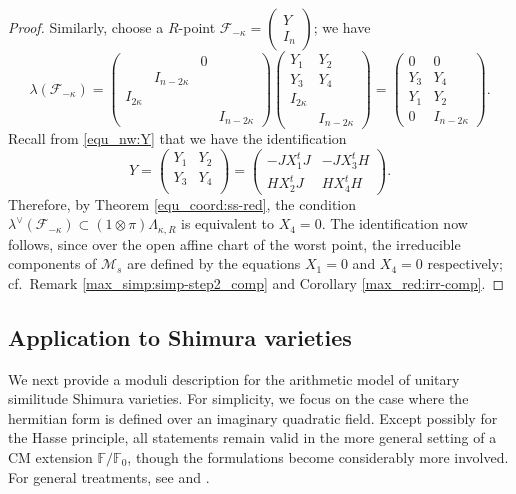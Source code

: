 \documentclass[pdflatex,sn-mathphys-num]{sn-jnl}%
\theoremstyle{thmstyleone}%
\theoremstyle{thmstyletwo}%
\numberwithin{equation}{subsection}
\theoremstyle{thmstylethree}%
\newcommand{\BF}{\ensuremath{\mathbb{F}}\xspace}
\newcommand{\CF}{\ensuremath{\mathcal{F}}\xspace}
\newcommand{\CM}{\ensuremath{\mathcal{M}}\xspace}
\begin{document}
\begin{proof}
Similarly, choose a $R$-point $\CF_{-\kappa}=\left(\begin{matrix}
	Y\\I_n
\end{matrix}\right)$; we have
\begin{equation*}
    \lambda(\CF_{-\kappa})=
    \left(
\begin{matrix}
	&          &   0      &   \\
	&   I_{n-2\kappa}  &          &   \\
	I_{2\kappa}    &          &          &   \\
	&          &          &I_{n-2\kappa}
\end{matrix}\right)
\left(\begin{matrix}
    Y_1&Y_2\\Y_3&Y_4\\I_{2\kappa}&\\&I_{n-2\kappa}
\end{matrix}\right)=
\left(\begin{matrix}
    0&0\\Y_3&Y_4\\Y_1&Y_2\\0&I_{n-2\kappa}
\end{matrix}\right).
\end{equation*}
Recall from \eqref{equ_nw:Y} that we have the identification
\begin{equation*}
    Y=
    \left(\begin{matrix}
    Y_1 &   Y_2 \\
    Y_3 &   Y_4 \\
\end{matrix}\right)=
    \left(\begin{matrix}
    -JX_1^t J &   -JX_3^t H  \\
    H X_2^t J   &   HX_4^t H
    \end{matrix}\right).
\end{equation*}
Therefore, by Theorem \ref{equ_coord:ss-red}, the condition $\lambda^\vee(\CF_{-\kappa})\subset (1\otimes \pi)\Lambda_{\kappa,R}$ is equivalent to $X_4=0$. 
The identification now follows, since over the open affine chart of the worst point, the irreducible components of $\CM_s$ are defined by the equations $X_1=0$ and $X_4=0$ respectively;
cf.\ Remark \ref{max_simp:simp-step2_comp} and Corollary \ref{max_red:irr-comp}.
\end{proof}




\subsection{Application to Shimura varieties}\label{application_Shimura}
We next provide a moduli description for the arithmetic model of unitary similitude Shimura varieties. For simplicity, we focus on the case where the hermitian form is defined over an imaginary quadratic field. Except possibly for the Hasse principle, all statements remain valid in the more general setting of a CM extension $\BF/\BF_0$, though the formulations become considerably more involved. For general treatments, see \cite[\S 11]{LZ2021} and \cite[\S 6]{LMZ25}.
		
\end{document}
